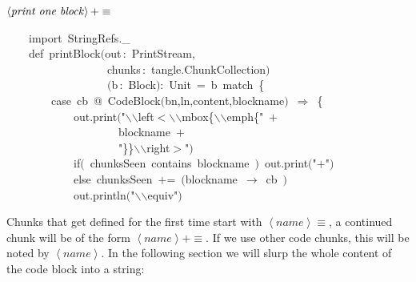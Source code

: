 \documentclass[a4paper,12pt]{article}
\begin{document}
$\left<\mbox{\emph{print one block}}\right>+\equiv$
\begin{program}~~~~{\vem import}~StringRefs.\_
\\~~~~{\vem def}~printBlock$($out\,{\rm :}~PrintStream,
\\~~~~~~~~~~~~~~~~~~chunks\,{\rm :}~tangle.ChunkCollection$)$
\\~~~~~~~~~~~~~~~~~~$($b\,{\rm :}~Block$)${\rm :}~Unit~=~b~{\vem match}~{\small\{}
\\~~~~~~~~{\vem case}~cb~@~CodeBlock$($bn,ln,content,blockname$)$~$\Rightarrow$~{\small\{}
\\~~~~~~~~~~~~out.print$($"\Dollar$\backslash$$\backslash$left$<$$\backslash$$\backslash$mbox{\small\{}$\backslash$$\backslash$emph{\small\{}"~$+$
\\~~~~~~~~~~~~~~~~~~~~blockname~$+$
\\~~~~~~~~~~~~~~~~~~~~"{\small\}}{\small\}}$\backslash$$\backslash$right$>$"$)$
\\[0.5em]~~~~~~~~~~~~{\vem if}$($~chunksSeen~contains~blockname~$)$~out.print$($"$+$"$)$
\\~~~~~~~~~~~~{\vem else}~chunksSeen~$+$=~$($blockname~$\rightarrow$~cb~$)$
\\[0.5em]~~~~~~~~~~~~out.println$($"$\backslash$$\backslash$equiv\Dollar"$)$
\\[0.5em]\end{program}
Chunks that get defined for the first time start with
$\left<name\right>\equiv$, a continued chunk will be of the
form $\left<name\right>+\equiv$. If we use other code chunks,
this will be noted by $\left<name\right>$. In the following
section we will slurp the whole content of the code block
into a string:
\end{document}
